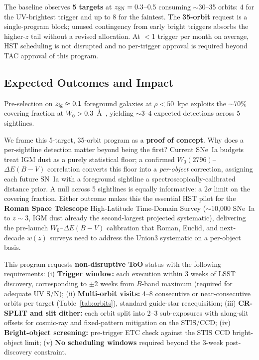 \documentclass[12pt]{article}
\begin{document}
\noindent
The baseline observes \textbf{5 targets} at $z_{\rm SN}=0.3$--0.5
consuming $\sim$30--35 orbits: 4 for the UV-brightest trigger and up to
8 for the faintest. The \textbf{35-orbit} request is a single-program
block; unused contingency from early bright triggers absorbs the
higher-$z$ tail without a revised allocation. At $<$1 trigger per month
on average, HST scheduling is not disrupted and no per-trigger approval
is required beyond TAC approval of this program.

\subsection*{Expected Outcomes and Impact}

Pre-selection on $z_{\rm fg}\approx0.1$ foreground galaxies at
$\rho<50$~kpc exploits the $\sim$70\%  covering fraction at
$W_0>0.3$~\AA\ \citep{Nielsen2013, Dutta2020, LanMo2018}, yielding
$\sim$3--4 expected detections across 5 sightlines.

We frame this 5-target, 35-orbit program as a \textbf{proof of
concept}. Why does a per-sightline detection matter beyond being the
first? Current SNe~Ia budgets treat IGM dust as a purely statistical
floor; a confirmed $W_0(2796)$--$\Delta E(B-V)$ correlation converts
this floor into a \emph{per-object} correction, assigning each future
SN~Ia with a foreground  sightline a
spectroscopically-calibrated distance prior. A null across 5
sightlines is equally informative: a $2\sigma$ limit on the
\citet{Menard2010, Menard2026} covering fraction. Either outcome makes
this the essential HST pilot for the \textbf{Roman Space Telescope}
High-Latitude Time-Domain Survey ($\sim$10{,}000 SNe~Ia to $z\sim3$,
IGM dust already the second-largest projected systematic), delivering
the pre-launch $W_0$--$\Delta E(B-V)$ calibration that Roman, Euclid,
and next-decade $w(z)$ surveys need to address the \citet{Rubin2023}
Union3 systematic on a per-object basis.




\clearpage
\specialreq %

This program requests \textbf{non-disruptive ToO} status with the
following requirements: (i) \textbf{Trigger window:} each execution
within 3 weeks of LSST discovery, corresponding to $\pm$2 weeks from
$B$-band maximum (required for adequate UV S/N); (ii)
\textbf{Multi-orbit visits:} 4--8 consecutive or near-consecutive
orbits per target (Table~\ref{tab:orbits}), standard guide-star
reacquisition; (iii) \textbf{CR-SPLIT and slit dither:} each orbit
split into 2--3 sub-exposures with along-slit offsets for cosmic-ray
and fixed-pattern mitigation on the STIS/CCD; (iv)
\textbf{Bright-object screening:} pre-trigger ETC check against the
STIS CCD bright-object limit; (v) \textbf{No scheduling windows}
required beyond the 3-week post-discovery constraint.
\end{document}

